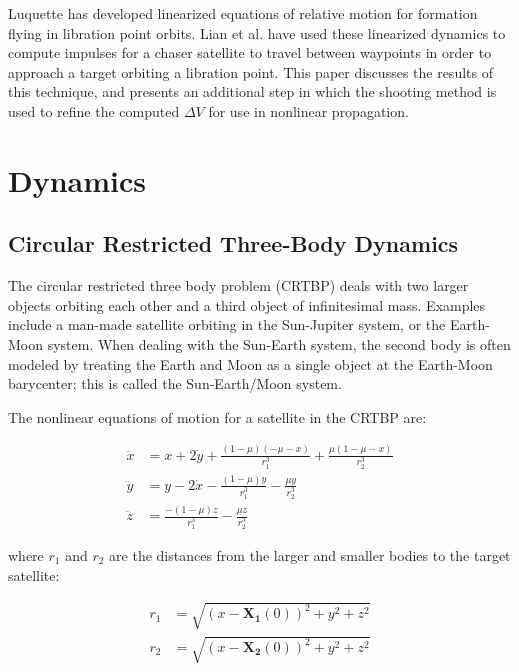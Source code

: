 \documentclass[a4paper]{article}
\begin{document}
Luquette has developed linearized equations of relative motion for formation flying in libration point orbits.  Lian et al. have used these linearized dynamics to compute impulses for a chaser satellite to travel between waypoints in order to approach a target orbiting a libration point.  This paper discusses the results of this technique, and presents an additional step in which the shooting method is used to refine the computed \(\Delta V\) for use in nonlinear propagation.

\section{Dynamics}

\subsection{Circular Restricted Three-Body Dynamics}
The circular restricted three body problem (CRTBP) deals with two larger objects orbiting each other and a third object of infinitesimal mass.  Examples include a man-made satellite orbiting in the Sun-Jupiter system, or the Earth-Moon system.  When dealing with the Sun-Earth system, the second body is often modeled by treating the Earth and Moon as a single object at the Earth-Moon barycenter; this is called the Sun-Earth/Moon system.

The nonlinear equations of motion for a satellite in the CRTBP are:

\begin{equation} \label{eq:CRTBP}
\begin{aligned}
\ddot{x} &= x + 2\dot{y} + \frac{(1 - \mu)(-\mu - x)}{r_1^3} + \frac{\mu(1 - \mu - x)}{r_2^3} \\
\ddot{y} &= y - 2\dot{x} - \frac{(1 - \mu)y}{r_1^3} - \frac{\mu y}{r_2^3} \\
\ddot{z} &= \frac{-(1 - \mu)z}{r_1^3} - \frac{\mu z}{r_2^3}
\end{aligned}
\end{equation}

where \(r_1\) and \(r_2\) are the distances from the larger and smaller bodies to the target satellite:

\begin{equation*}
\begin{aligned}
r_1 &= \sqrt{(x-\mathbf{X_1}(0))^2 + y^2 + z^2} \\
r_2 &= \sqrt{(x-\mathbf{X_2}(0))^2 + y^2 + z^2}
\end{aligned}
\end{equation*}
\end{document}
